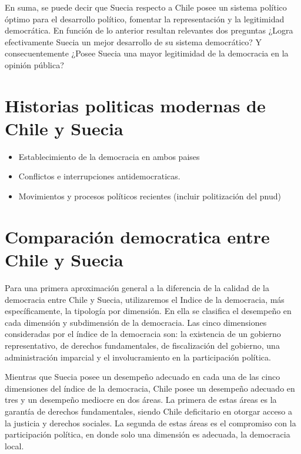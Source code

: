 \documentclass[12pt,twoside]{templates/facsothesis}
\begin{document}
En suma, se puede decir que Suecia respecto a Chile posee un sistema político óptimo para el desarrollo político, fomentar la representación y la legitimidad democrática. En función de lo anterior resultan relevantes dos preguntas ¿Logra efectivamente Suecia un mejor desarrollo de su sistema democrático? Y consecuentemente ¿Posee Suecia una mayor legitimidad de la democracia en la opinión pública?

\hypertarget{historias-politicas-modernas-de-chile-y-suecia}{%
\section{Historias politicas modernas de Chile y Suecia}\label{historias-politicas-modernas-de-chile-y-suecia}}

\begin{itemize}
\item
  Establecimiento de la democracia en ambos paises
\item
  Conflictos e interrupciones antidemocraticas.
\item
  Movimientos y procesos políticos recientes (incluir politización del pnud)
\end{itemize}

\hypertarget{comparaciuxf3n-democratica-entre-chile-y-suecia}{%
\section{Comparación democratica entre Chile y Suecia}\label{comparaciuxf3n-democratica-entre-chile-y-suecia}}

Para una primera aproximación general a la diferencia de la calidad de la democracia entre Chile y Suecia, utilizaremos el Indice de la democracia, más específicamente, la tipología por dimensión. En ella se clasifica el desempeño en cada dimensión y subdimensión de la democracia. Las cinco dimensiones consideradas por el índice de la democracia son: la existencia de un gobierno representativo, de derechos fundamentales, de fiscalización del gobierno, una administración imparcial y el involucramiento en la participación política.

Mientras que Suecia posee un desempeño adecuado en cada una de las cinco dimensiones del índice de la democracia, Chile posee un desempeño adecuado en tres y un desempeño mediocre en dos áreas. La primera de estas áreas es la garantía de derechos fundamentales, siendo Chile deficitario en otorgar acceso a la justicia y derechos sociales. La segunda de estas áreas es el compromiso con la participación política, en donde solo una dimensión es adecuada, la democracia local.
\end{document}
